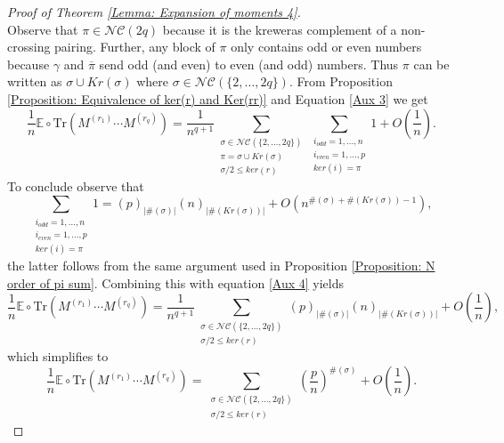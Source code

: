 \documentclass{article}
\theoremstyle{definition}
\newcommand{\E}{\mathbb{E}}
\newcommand{\NC}{\mathcal{NC}}
\newcommand{\Tr}{\text{Tr}}
\begin{document}
{\begin{proof}[Proof of Theorem \ref{Lemma: Expansion of moments 4}]
\begin{equation}
\end{equation}
Observe that $\pi\in \NC(2q)$ because it is the kreweras complement of a non-crossing pairing. Further, any block of $\pi$ only contains odd or even numbers because $\gamma$ and $\overline{\pi}$ send odd (and even) to even (and odd) numbers. Thus $\pi$ can be written as $\sigma \cup Kr(\sigma)$ where $\sigma\in \NC(\{2,\dots,2q\})$. From Proposition \ref{Proposition: Equivalence of ker(r) and Ker(rr)} and Equation \ref{Aux 3} we get
\begin{equation}\label{Aux 4}
\frac{1}{n}\E\circ \Tr(M^{(r_1)}\cdots M^{(r_q)})=\frac{1}{n^{q+1}}\sum_{\substack{\sigma\in \NC(\{2,\dots,2q\}) \\ \pi=\sigma\cup Kr(\sigma) \\ \sigma/2\leq ker(r)}}\sum_{\substack{i_{odd}=1,\dots,n \\ i_{even}=1,\dots,p \\ ker(i)=\pi}}1+O(\frac{1}{n}).
\end{equation}
To conclude observe that
$$\sum_{\substack{i_{odd}=1,\dots,n \\ i_{even}=1,\dots,p \\ ker(i)=\pi}}1=(p)_{|\#(\sigma)|}(n)_{|\#(Kr(\sigma))|}+O(n^{\#(\sigma)+\#(Kr(\sigma))-1}),$$
the latter  follows from the same argument used in Proposition \ref{Proposition: N order of pi sum}. Combining this with equation \ref{Aux 4} yields
\begin{equation*}
\frac{1}{n}\E\circ \Tr(M^{(r_1)}\cdots M^{(r_q)})=\frac{1}{n^{q+1}}\sum_{\substack{\sigma\in \NC(\{2,\dots,2q\}) \\ \sigma/2\leq ker(r)}}(p)_{|\#(\sigma)|}(n)_{|\#(Kr(\sigma))|}+O(\frac{1}{n}),
\end{equation*}
which simplifies to
\begin{equation*}
\frac{1}{n}\E\circ \Tr(M^{(r_1)}\cdots M^{(r_q)})=\sum_{\substack{\sigma\in \NC(\{2,\dots,2q\}) \\ \sigma/2\leq ker(r)}}\left(\frac{p}{n}\right)^{\#(\sigma)}+O(\frac{1}{n}).
\end{equation*}
\end{proof}

}
\end{document}
